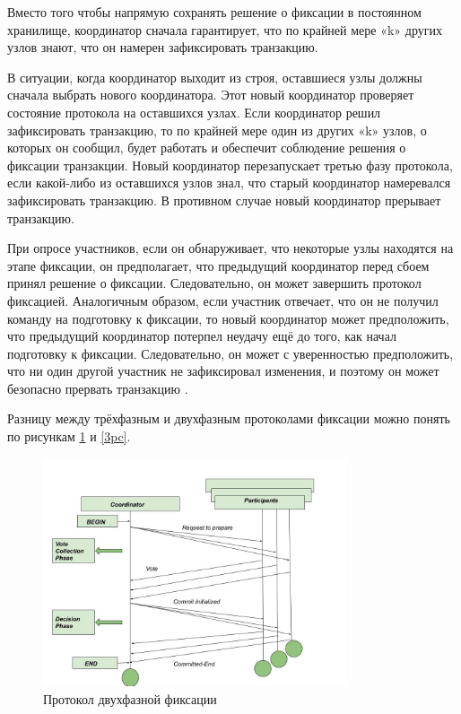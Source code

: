 Вместо того чтобы напрямую сохранять решение о фиксации в постоянном хранилище, координатор сначала гарантирует, что по крайней мере «k» других узлов знают, что он намерен зафиксировать 
транзакцию.

В ситуации, когда координатор выходит из строя, оставшиеся узлы должны сначала выбрать нового координатора. Этот новый координатор проверяет состояние протокола на оставшихся узлах. 
Если координатор решил зафиксировать транзакцию, то по крайней мере один из других «k» узлов, о которых он сообщил, будет работать и обеспечит соблюдение решения о фиксации транзакции. 
Новый координатор перезапускает третью фазу протокола, если какой-либо из оставшихся узлов знал, что старый координатор намеревался зафиксировать транзакцию. В противном случае новый 
координатор прерывает транзакцию.

При опросе участников, если он обнаруживает, что некоторые узлы находятся на этапе фиксации, он предполагает, что предыдущий координатор перед сбоем принял решение о фиксации.
Следовательно, он может завершить протокол фиксацией. Аналогичным образом, если участник отвечает, что он не получил команду на подготовку к фиксации, то новый координатор может 
предположить, что предыдущий координатор потерпел неудачу ещё до того, как начал подготовку к фиксации. Следовательно, он может с уверенностью предположить, что ни один другой участник 
не зафиксировал изменения, и поэтому он может безопасно прервать транзакцию \autocite{3PC}.

Разницу между трёхфазным и двухфазным протоколами фиксации можно понять по рисункам \ref{2pc} и \ref{3pc}.

\begin{figure}[h!]
    \centering
    \includegraphics[width=0.8\textwidth]{assets/distributed/2PhaseCommit.png}
    \caption{Протокол двухфазной фиксации}
    \label{2pc}
\end{figure}

